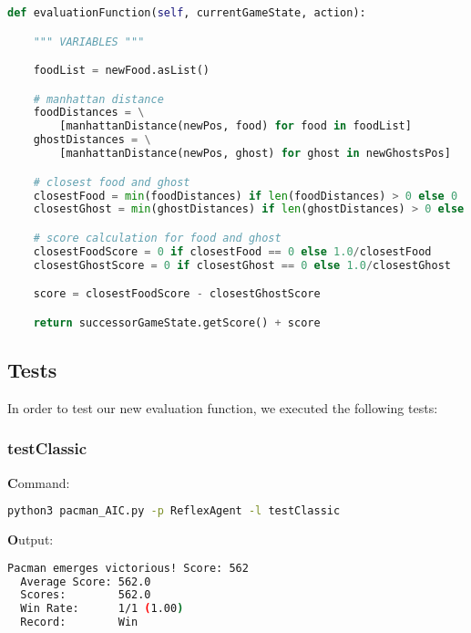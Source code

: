\documentclass{article}
\begin{document}
\begin{lstlisting}[language=python, frame=tlbr, framesep=6pt, backgroundcolor=\color{light-gray}]
def evaluationFunction(self, currentGameState, action):

    """ VARIABLES """

    foodList = newFood.asList()

    # manhattan distance
    foodDistances = \
        [manhattanDistance(newPos, food) for food in foodList]
    ghostDistances = \
        [manhattanDistance(newPos, ghost) for ghost in newGhostsPos]

    # closest food and ghost
    closestFood = min(foodDistances) if len(foodDistances) > 0 else 0
    closestGhost = min(ghostDistances) if len(ghostDistances) > 0 else 0

    # score calculation for food and ghost
    closestFoodScore = 0 if closestFood == 0 else 1.0/closestFood
    closestGhostScore = 0 if closestGhost == 0 else 1.0/closestGhost

    score = closestFoodScore - closestGhostScore

    return successorGameState.getScore() + score
\end{lstlisting}

\subsection{Tests}

In order to test our new evaluation function, we executed the following tests:

\subsubsection{testClassic}
\label{sec:testClassic}

\textbf Command:

\begin{lstlisting}[language=bash, frame=tlbr, framesep=6pt, backgroundcolor=\color{light-gray}]
    python3 pacman_AIC.py -p ReflexAgent -l testClassic
\end{lstlisting}

\noindent\textbf Output:

\begin{lstlisting}[language=bash, frame=tlbr, framesep=6pt, backgroundcolor=\color{light-gray}]
  Pacman emerges victorious! Score: 562
  Average Score: 562.0
  Scores:        562.0
  Win Rate:      1/1 (1.00)
  Record:        Win
\end{lstlisting}
\end{document}
